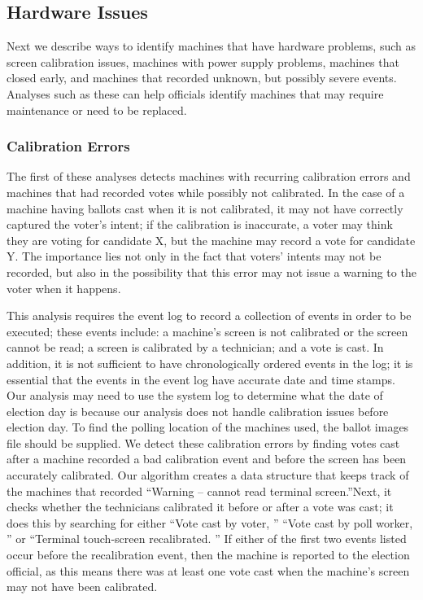 \subsection{Hardware Issues}
Next we describe ways to identify machines that have hardware problems, such as screen calibration issues, machines with power supply problems, machines that closed early, and machines that recorded unknown, but possibly severe events.  Analyses such as these can help officials identify machines that may require maintenance or need to be replaced.  

\subsubsection{Calibration Errors}
The first of these analyses detects machines with recurring calibration errors and machines that had recorded votes while possibly not calibrated.  In the case of a machine having ballots cast when it is not calibrated, it may not have correctly captured the voter's intent; if the calibration is inaccurate, a voter may think they are voting for candidate X, but the machine may record a vote for candidate Y.  The importance lies not only in the fact that voters' intents may not be recorded, but also in the possibility that this error may not issue a warning to the voter when it happens.    

This analysis requires the event log to record a collection of events in order to be executed; these events include: a machine's screen is not calibrated or the screen cannot be read; a screen is calibrated by a technician; and a vote is cast.  In addition, it is not sufficient to have chronologically ordered events in the log; it is essential that the events in the event log have accurate date and time stamps.  Our analysis may need to use the system log to determine what the date of election day is because our analysis does not handle calibration issues before election day.  To find the polling location of the machines used, the ballot images file should be supplied.  We detect these calibration errors by finding votes cast after a machine recorded a bad calibration event and before the screen has been accurately calibrated.  Our algorithm creates a data structure that keeps track of the machines that recorded \textquotedblleft Warning – cannot read terminal screen.\textquotedblright \hspace{2 mm}Next, it checks whether the technicians calibrated it before or after a vote was cast; it does this by searching for either \textquotedblleft Vote cast by voter, \textquotedblright \hspace{1 mm} \textquotedblleft Vote cast by poll worker, \textquotedblright \hspace{1 mm} or \textquotedblleft Terminal touch-screen recalibrated. \textquotedblright \hspace{2 mm} If either of the first two events listed occur before the recalibration event, then the machine is reported to the election official, as this means there was at least one vote cast when the machine's screen may not have been calibrated.  

